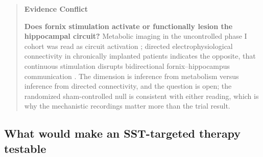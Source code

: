 \documentclass[11pt]{article}
\begin{document}
\begin{quote}
\noindent\textbf{Evidence Conflict}\par
\textbf{Does fornix stimulation activate or functionally lesion the hippocampal circuit?} Metabolic imaging in the uncontrolled phase I cohort was read as circuit activation \citep{Laxton2010}; directed electrophysiological connectivity in chronically implanted patients indicates the opposite, that continuous stimulation disrupts bidirectional fornix--hippocampus communication \citep{Stanslaski2026}. The dimension is inference from metabolism versus inference from directed connectivity, and the question is open; the randomized sham-controlled null \citep{Targum2021} is consistent with either reading, which is why the mechanistic recordings matter more than the trial result.

\end{quote}

\subsection{What would make an SST-targeted therapy testable}
\label{sec-10-testable}
\end{document}
